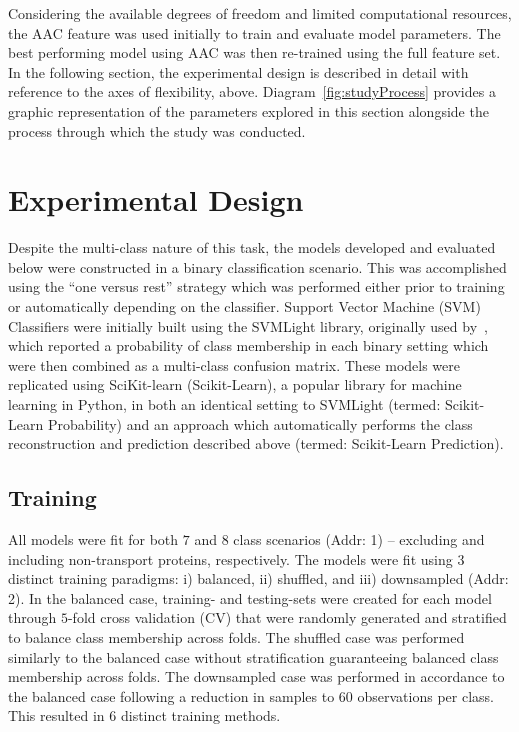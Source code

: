 Considering the available degrees of freedom and limited computational resources, the AAC feature was used initially
to train and evaluate model parameters. The best performing model using AAC was then re-trained using the full feature
set. In the following section, the experimental design is described in detail with reference to the axes of flexibility,
above. Diagram~\ref{fig:studyProcess} provides a graphic representation of the parameters explored in this
section alongside the process through which the study was conducted.

\section{Experimental Design}
\label{sec:experimentaldesign}
Despite the multi-class nature of this task, the models developed and evaluated below were constructed in a binary
classification scenario. This was accomplished using the ``one versus rest'' strategy which was performed either prior
to training or automatically depending on the classifier. Support Vector Machine (SVM) Classifiers were initially built
using the SVMLight library, originally used by~\cite{mishra_prediction_2014}, which reported a probability of class
membership in each binary setting which were then combined as a multi-class confusion matrix. These models were
replicated using SciKit-learn (Scikit-Learn), a popular library for machine learning in Python, in both an identical setting
to SVMLight (termed: Scikit-Learn Probability) and an approach which automatically performs the class reconstruction and
prediction described above (termed: Scikit-Learn Prediction). 

\subsection{Training}
All models were fit for both $7$ and $8$ class scenarios (Addr: 1) -- excluding and including non-transport proteins,
respectively. The models were fit using $3$ distinct training paradigms: i) balanced, ii) shuffled, and iii)
downsampled (Addr: 2). In the balanced case, training- and testing-sets were created for each model through $5$-fold
cross validation (CV) that were randomly generated and stratified to balance class membership across folds. The
shuffled case was performed similarly to the balanced case without stratification guaranteeing balanced class membership
across folds. The downsampled case was performed in accordance to the balanced case following a reduction in
samples to $60$ observations per class. This resulted in $6$ distinct training methods.

